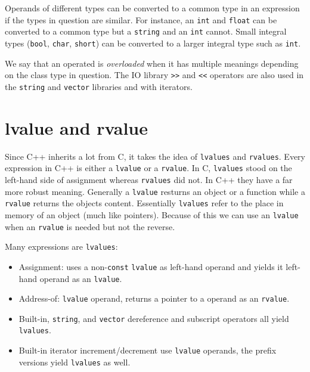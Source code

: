 \documentclass[12pt, a4paper]{report}
\begin{document}
Operands of different types can be converted to a common type in an expression if the types in question are similar.
For instance, an \verb|int| and \verb|float| can be converted to a common type but a \verb|string| and an \verb|int| cannot.
Small integral types (\verb|bool|, \verb|char|, \verb|short|) can be converted to a larger integral type such as \verb|int|.

We say that an operated is \emph{overloaded} when it has multiple meanings depending on the class type in question.
The IO library \verb|>>| and \verb|<<| operators are also used in the \verb|string| and \verb|vector| libraries and with iterators.

\section{lvalue and rvalue}
Since C++ inherits a lot from C, it takes the idea of \verb|lvalues| and \verb|rvalues|.
Every expression in C++ is either a \verb|lvalue| or a \verb|rvalue|.
In C, \verb|lvalues| stood on the left-hand side of assignment whereas \verb|rvalues| did not.
In C++ they have a far more robust meaning.
Generally a \verb|lvalue| resturns an object or a function while a \verb|rvalue| returns the objects content.
Essentially \verb|lvalues| refer to the place in memory of an object (much like pointers).
Because of this we can use an \verb|lvalue| when an \verb|rvalue| is needed but not the reverse.

Many expressions are \verb|lvalues|:
\begin{itemize}
  \item Assignment: uses a non-\verb|const| \verb|lvalue| as left-hand operand and yields it left-hand operand as an \verb|lvalue|.
  \item Address-of: \verb|lvalue| operand, returns a pointer to a operand as an \verb|rvalue|.
  \item Built-in, \verb|string|, and \verb|vector| dereference and subscript operators all yield \verb|lvalues|.
  \item Built-in iterator increment/decrement use \verb|lvalue| operands, the prefix versions yield \verb|lvalues| as well.
\end{itemize}
\end{document}
